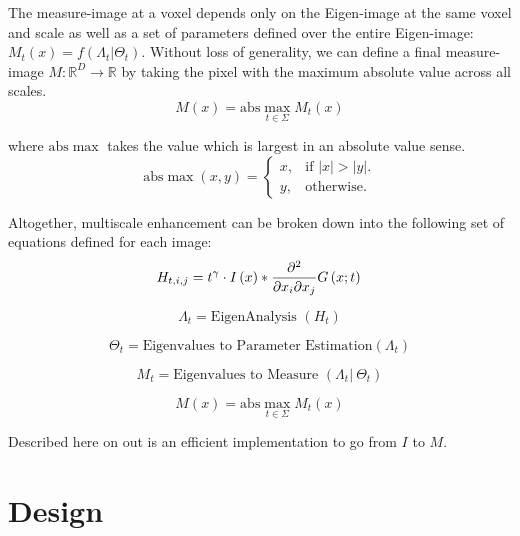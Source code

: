 \documentclass{InsightArticle}
\newcommand{\absmax}{\mathrm{abs}\!\max} %
\begin{document}
The measure-image at a voxel depends only on the Eigen-image at the same voxel and scale as well as a set of parameters defined over the entire Eigen-image: $M_t(x) = f\left(\Lambda_t | \Theta_t\right)$.
Without loss of generality, we can define a final measure-image $M: \mathbb{R}^D \rightarrow \mathbb{R}$ by taking the pixel with the maximum absolute value across all scales.
\begin{equation}
  M(x) = \absmax_{t \in \Sigma} M_t(x)
  \label{eqn:abs_max_measure}
\end{equation}

where $\absmax$ takes the value which is largest in an absolute value sense.
\begin{equation}
  \absmax(x, y) = \begin{cases}
    x, & \text{if }|x| > |y|.\\
    y, & \text{otherwise}.
  \end{cases}
  \label{eqn:abs_max}
\end{equation}

Altogether, multiscale enhancement can be broken down into the following set of equations defined for each image:
\begin{equation}
  H_{t,i,j} = t^\gamma \cdot I\left(x\right) * \frac{\partial^2}{\partial x_i \partial x_j} G\left(x; t\right) \\
  \label{eqn:hess}
\end{equation}

\begin{equation}
  \Lambda_t = \textrm{EigenAnalysis }\left(H_t\right)
  \label{eqn:eig}
\end{equation}

\begin{equation}
  \Theta_t = \textrm{Eigenvalues to Parameter Estimation} \left(\Lambda_t\right)
  \label{eqn:estimation}
\end{equation}

\begin{equation}
  M_t = \textrm{Eigenvalues to Measure } \left(\Lambda_t | \: \Theta_t \right)
  \label{eqn:measure}
\end{equation}

\begin{equation}
  M(x) = \absmax_{t \in \Sigma} M_t(x)
  \label{eqn:over_scale}
\end{equation}

Described here on out is an efficient implementation to go from $I$ to $M$.

\section{Design}
\label{sec:design}
\end{document}
